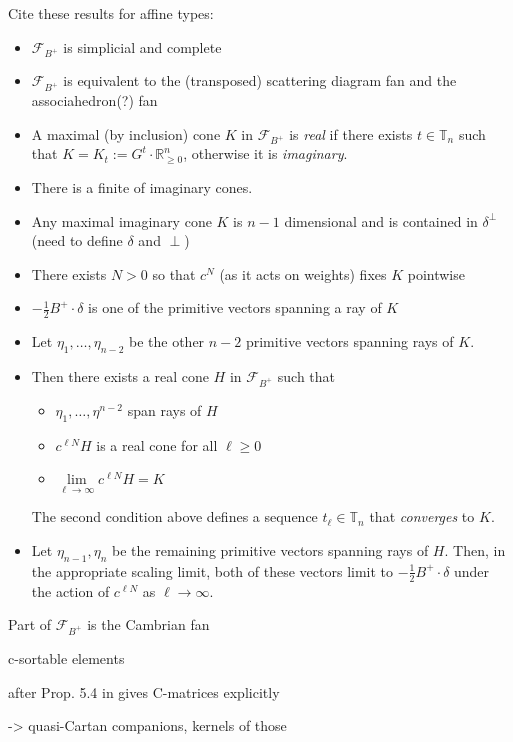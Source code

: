 \documentclass{amsart}
\numberwithin{theorem}{section}
\newcommand{\cF}{\mathcal{F}}
\newcommand{\RR}{\mathbb{R}}
\newcommand{\TT}{\mathbb{T}}
\begin{document}
  Cite these results for affine types:
  \begin{itemize}
    \item $\cF_{B^+}$ is simplicial and complete 
    \item $\cF_{B^+}$ is equivalent to the (transposed) scattering diagram fan and the associahedron(?) fan
    \item A maximal (by inclusion) cone $K$ in $\cF_{B^+}$ is \emph{real} if there exists $t\in\TT_n$ such that $K=K_t:=G^t\cdot\RR^n_{\ge0}$, otherwise it is \emph{imaginary}.
    \item There is a finite of imaginary cones.
    \item Any maximal imaginary cone $K$ is $n-1$ dimensional and is contained in $\delta^\perp$ (need to define $\delta$ and $\perp$)
    \item There exists $N>0$ so that $c^N$ (as it acts on weights) fixes $K$ pointwise
    \item $-\frac12 B^+\cdot\delta$ is one of the primitive vectors spanning a ray of $K$
    \item Let $\eta_1,\ldots,\eta_{n-2}$ be the other $n-2$ primitive vectors spanning rays of $K$.  
    \item Then there exists a real cone $H$ in $\cF_{B^+}$ such that
      \begin{itemize}
        \item $\eta_1,\ldots,\eta^{n-2}$ span rays of $H$
        \item $c^{\ell N} H$ is a real cone for all $\ell\ge0$
        \item $\lim\limits_{\ell\to\infty} c^{\ell N} H = K$
      \end{itemize}
      The second condition above defines a sequence $t_\ell\in\TT_n$ that \emph{converges} to $K$.
    \item Let $\eta_{n-1},\eta_n$ be the remaining primitive vectors spanning rays of $H$.  Then, in the appropriate scaling limit, both of these vectors limit to $-\frac12 B^+\cdot\delta$ under the action of $c^{\ell N}$ as $\ell\to\infty$.
  \end{itemize}

  Part of $\cF_{B^+}$ is the Cambrian fan
  
  c-sortable elements
  
  after Prop. 5.4 in \cite{combinatorial_frameworks} gives C-matrices explicitly
  
  -> quasi-Cartan companions, kernels of those
\end{document}
